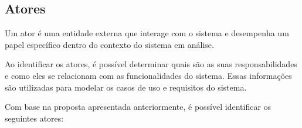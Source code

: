 \subsection{Atores}
Um ator é uma entidade externa que interage com o sistema e desempenha um papel específico dentro do contexto do sistema em análise.

Ao identificar os atores, é possível determinar quais são as suas responsabilidades e como eles se relacionam com as funcionalidades do sistema. Essas informações são utilizadas para modelar os casos de uso e requisitos do sistema.

Com base na proposta apresentada anteriormente, é possível identificar os seguintes atores:

